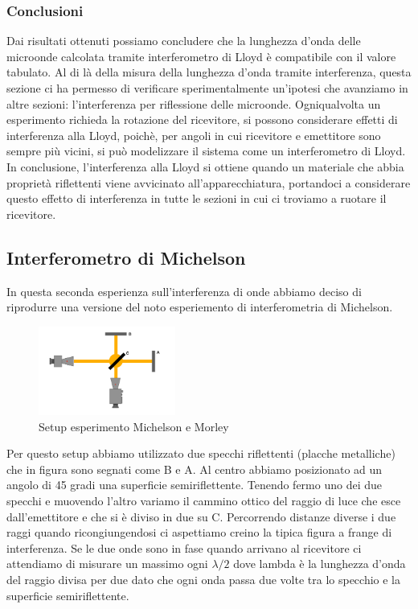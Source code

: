 \documentclass[letterpaper,12pt]{article}
\begin{document}
\subsubsection{Conclusioni}
Dai risultati ottenuti possiamo concludere che la lunghezza d'onda delle microonde calcolata tramite interferometro
di Lloyd è compatibile con il valore tabulato.
Al di là della misura della lunghezza d'onda tramite interferenza, questa sezione ci ha permesso di verificare
sperimentalmente un'ipotesi che avanziamo in altre sezioni: l'interferenza per riflessione delle microonde. Ogniqualvolta
un esperimento richieda la rotazione del ricevitore, si possono considerare effetti di interferenza alla Lloyd,
poichè, per angoli in cui ricevitore e emettitore sono sempre più vicini, si può modelizzare il sistema come
un interferometro di Lloyd.\\
In conclusione, l'interferenza alla Lloyd si ottiene quando un materiale che abbia proprietà riflettenti viene
avvicinato all'apparecchiatura, portandoci a considerare questo effetto di interferenza in tutte le sezioni in cui
ci troviamo a ruotare il ricevitore.\\


\subsection{Interferometro di Michelson}
In questa seconda esperienza sull'interferenza di onde abbiamo deciso di riprodurre una versione del noto esperiemento di 
interferometria di Michelson.
\begin{figure}[h!]
	\centering
	\includegraphics[width = 0.4\textwidth]{MichelsonSetup.png}
	\caption{Setup esperimento Michelson e Morley}
	\label{fig:GraficoBragg}
\end{figure}
Per questo setup abbiamo utilizzato due specchi riflettenti (placche metalliche)
che in figura sono segnati come B e A. Al centro abbiamo posizionato ad un angolo di 45 gradi una superficie semiriflettente.
Tenendo fermo uno dei due specchi e muovendo l'altro variamo il cammino ottico del raggio di luce che esce dall'emettitore e che si è diviso in due su C.
Percorrendo distanze diverse i due raggi quando ricongiungendosi ci aspettiamo creino la tipica figura a frange di interferenza.  
Se le due onde sono in fase quando arrivano al ricevitore ci attendiamo di misurare un massimo ogni $\lambda/2$ dove lambda è la lunghezza d'onda del raggio divisa per due dato che 
ogni onda passa due volte tra lo specchio e la superficie semiriflettente.
\end{document}
